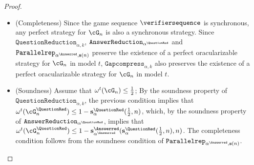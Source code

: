 \begin{proof}
	
	\begin{itemize}
		\item (Completeness) Since the game sequence $\verifiersequence$ is synchronous, any perfect strategy for $\cG_n$ is also a synchronous strategy. Since $\texttt{QuestionReduction}_{\alpha, k}$, $\texttt{AnswerReduction}_{\alpha^{\QuestionRed}}$ and $\texttt{Parallelrep}_{\alpha^{\Answerred}, \mathbf{s}(n)}$ preserve the existence of a perfect oracularizable strategy for $\cG_n$ in model $t$,  $\texttt{Gapcompress}_{\alpha, k}$ also preserves the existence of a perfect oracularizable strategy for $\cG_n$ in model $t$.
		\item (Soundness) Assume that $\omega^{t}(\cG_n) \leq \frac{1}{2}$; By the soundness property of $\texttt{QuestionReduction}_{\alpha, k}$, the previous condition implies that $\omega^{t}(\cG_n^{\QuestionRed}) \leq 1 -  \mathbf{s}_{\alpha}^{\QuestionRed}( \frac{1}{2},n)$, which, by the soundness property of $\texttt{AnswerReduction}_{\alpha^{\QuestionRed}}$, implies that $\omega^{t}(\cG_n^{\QuestionRed}) \leq 1 - \mathbf{s}_{\alpha^{\Answerred} }^{\Answerred} (  \mathbf{s}_{\alpha}^{\QuestionRed}( \frac{1}{2},n), n)$. The completeness condition follows from the soundness condition of $\texttt{Parallelrep}_{\alpha^{\Answerred}, \mathbf{s}(n)}$.
	\end{itemize}
\end{proof}



